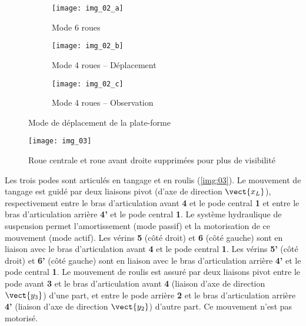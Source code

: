 \begin{figure}[H]
\centering
\begin{subfigure}{0.25\textwidth}
    \texttt{[image: img\_02\_a]}
    \caption{Mode 6 roues}
    \label{fig:02a}
\end{subfigure} \hfill
\begin{subfigure}{0.25\textwidth}
    \texttt{[image: img\_02\_b]}
    \caption{Mode 4 roues -- Déplacement}
    \label{fig:02a}
\end{subfigure} \hfill
\begin{subfigure}{0.25\textwidth}
    \texttt{[image: img\_02\_c]}
    \caption{Mode 4 roues -- Observation}
    \label{fig:02a}
\end{subfigure}\caption{Mode de déplacement de la plate-forme \label{fig:02}}
\end{figure}


\begin{figure}[H]
\centering
\texttt{[image: img\_03]}
\caption{Roue centrale et roue avant droite supprimées pour plus de visibilité \label{img:03}}
\end{figure}

Les trois podes sont articulés en tangage et en roulis (\autoref{img:03}). Le mouvement de tangage est guidé par deux liaisons pivot (d’axe de direction  $\vect{x_L}$), respectivement entre le bras d’articulation avant \textbf{4} et le pode central \textbf{1} et entre le bras d’articulation arrière \textbf{4’} et le pode central \textbf{1}. Le système hydraulique de suspension permet l’amortissement (mode passif) et la motorisation de ce mouvement (mode actif). Les vérins \textbf{5} (côté droit) et \textbf{6} (côté gauche) sont en liaison avec le bras d’articulation avant \textbf{4} et le pode central \textbf{1}. Les vérins \textbf{5’} (côté droit) et \textbf{6’} (côté gauche) sont en liaison avec le bras d’articulation arrière \textbf{4’} et le pode central \textbf{1}. Le mouvement de roulis est assuré par deux liaisons pivot entre le pode avant \textbf{3} et le bras d’articulation avant \textbf{4} (liaison d’axe de direction $\vect{y_3}$) d’une part, et entre le pode arrière \textbf{2} et le bras d’articulation arrière \textbf{4’}  (liaison d’axe de direction $\vect{y_2}$) d’autre part. Ce mouvement n’est pas motorisé. 

